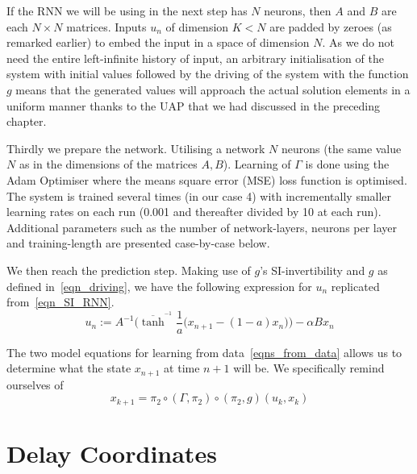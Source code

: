 If the RNN we will be using in the next step has $N$ neurons, then $A$ and $B$ are each $N\times{N}$ matrices. Inputs $u_n$ of dimension $K < N$ are padded by zeroes (as remarked earlier) to embed the input in a space of dimension $N$. As we do not need the entire left-infinite history of input, an arbitrary initialisation of the system with initial values followed by the driving of the system with the function $g$ means that the generated values will approach the actual solution elements in a uniform manner thanks to the UAP that we had discussed in the preceding chapter.

Thirdly we prepare the network. Utilising a network $N$ neurons (the same value $N$ as in the dimensions of the matrices $A,B$). Learning of $\Gamma$ is done using the Adam Optimiser where the means square error (MSE) loss function is optimised. The system is trained several times (in our case 4) with incrementally smaller learning rates on each run (0.001 and thereafter divided by 10 at each run). 
Additional parameters such as the number of network-layers, neurons per layer and training-length are presented case-by-case below.

We then reach the prediction step. Making use of $g$'s SI-invertibility and $g$ as defined in~\eqref{eqn_driving}, we have the following expression for $u_n$ replicated from~\eqref{eqn_SI_RNN}.
\begin{equation*}
  u_n := A^{-1}\bigg(\overline{\tanh}^{^{-1}}\frac{1}{a}\Big(x_{n+1}-(1-a)x_n\Big) \bigg) - \alpha B x_n
\end{equation*}
    
The two model equations for learning from data~\eqref{eqns_from_data} allows us to determine what the state $x_{n+1}$ at time $n+1$ will be. 
We specifically remind ourselves of \[x_{k+1}=\pi_2 \circ (\Gamma, \pi_2) \circ (\pi_2,g) (u_k,x_k)\]

\section{Delay Coordinates}

